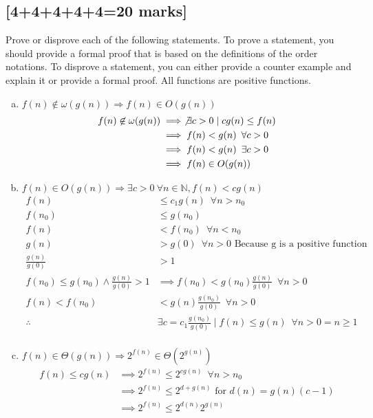 \documentclass[12pt]{article}
\begin{document}
\subsection{[4+4+4+4+4=20 marks]}
Prove or disprove each of the following statements.  To prove a
statement, you should provide a formal proof that is based on the
definitions of the order notations.  To disprove a statement, you can
either provide a counter example and explain it or provide a formal proof.
All functions are positive functions.
\begin{enumerate}[(a)]
\item $f(n) \not \in \omega(g(n)) \Rightarrow f(n) \in O(g(n))$
\begin{align*}
f(n) \not\in \omega(g(n)) & \implies \not\exists c > 0 \mid cg(n) \leq f(n) \\
&\implies f(n) < g(n) \enspace \forall c > 0\\
&\implies f(n) < g(n) \enspace \exists c >0 \\
&\implies f(n) \in O(g(n))
\end{align*}
\item $f(n) \in O(g(n)) \Rightarrow \exists c>0 \ \forall n\in \mathbb{N}, f(n) < c g(n)$
\begin{align*}
f(n) &\leq c_1 g(n) \enspace \forall n > n_{0} \\
f(n_0) &\leq g(n_0)\\
f(n) &< f(n_0) \enspace \forall n < n_0\\
g(n) &> g(0) \enspace \forall n > 0\text{ Because g is a positive function }\\
\frac{g(n)}{g(0)} &> 1\\
f(n_0) \leq g(n_0) \land \frac{g(n)}{g(0)} > 1 &\implies
f(n_0) < g(n_0)\frac{g(n)}{g(0)}\enspace \forall n > 0\\
f(n) < f(n_0) &< g(n)\frac{g(n_0)}{g(0)}\enspace \forall n > 0\\
\therefore & \exists c = c_1 \frac{g(n_0)}{g(0)} \mid  f(n) \leq g(n) \enspace \forall n > 0 = n \geq 1\\
\end{align*}
\item $f(n)\in \Theta(g(n))\Rightarrow 2^{f(n)} \in \Theta(2^{g(n)})$
\begin{align*}
f(n) \leq cg(n)
&\implies 2^{f(n)} \leq 2^{cg(n)} \enspace \forall n > n_0\\
&\implies 2^{f(n)} \leq 2^{d+g(n)} \text { for } d(n) = g(n)(c-1)\\
&\implies 2^{f(n)} \leq 2^{d(n)}2^{g(n)}\\

\end{align*}
\end{enumerate}
\end{document}
